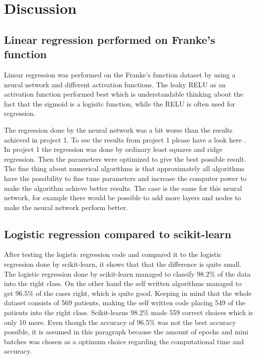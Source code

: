 \documentclass[../main.tex]{subfiles}
\begin{document}
\section{Discussion}
\subsection{Linear regression performed on Franke's function}
Linear regression was performed on the Franke's function dataset by using a neural network and different activation functions. The leaky RELU as an activation function performed best which is understandable thinking about the fact that the sigmoid is a logisitc function, while the RELU is often used for regression.

The regression done by the neural network was a bit worse than the results achieved in project 1. To see the results from project 1 please have a look here \cite{project1}. In project 1 the regression was done by ordinary least squares and ridge regression. Then the parameters were optimized to give the best possible result. The fine thing about numerical algorithms is that approximately all algorithms have the possibility to fine tune parameters and increase the computer power to make the algorithm achieve better results. The case is the same for this neural network, for example there would be possible to add more layers and nodes to make the neural network perform better. 


\subsection{Logistic regression compared to scikit-learn}
After testing the logistic regression code and compared it to the logistic regression done by scikit-learn, it shows that that the difference is quite small. The logistic regression done by scikit-learn managed to classify 98.2\% of the data into the right class. On the other hand the self written algorithms managed to get 96.5\% of the cases right, which is quite good. Keeping in mind that the whole dataset consists of 569 patients, making the self written code placing 549 of the patients into the right class. Scikit-learns 98.2\% made 559 correct choices which is only 10 more. Even though the accuracy of 96.5\% was not the best accuracy possible, it is assumed in this paragraph because the amount of epochs and mini batches was chosen as a optimum choice regarding the computational time and accuracy. 
\end{document}
